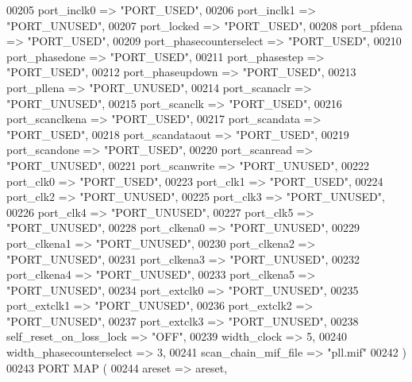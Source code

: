 \begin{DoxyCode}
{00205         port\_inclk0 => \textcolor{keyword}{"PORT\_USED"},
00206         port\_inclk1 => \textcolor{keyword}{"PORT\_UNUSED"},
00207         port\_locked => \textcolor{keyword}{"PORT\_USED"},
00208         port\_pfdena => \textcolor{keyword}{"PORT\_USED"},
00209         port\_phasecounterselect => \textcolor{keyword}{"PORT\_USED"},
00210         port\_phasedone => \textcolor{keyword}{"PORT\_USED"},
00211         port\_phasestep => \textcolor{keyword}{"PORT\_USED"},
00212         port\_phaseupdown => \textcolor{keyword}{"PORT\_USED"},
00213         port\_pllena => \textcolor{keyword}{"PORT\_UNUSED"},
00214         port\_scanaclr => \textcolor{keyword}{"PORT\_UNUSED"},
00215         port\_scanclk => \textcolor{keyword}{"PORT\_USED"},
00216         port\_scanclkena => \textcolor{keyword}{"PORT\_USED"},
00217         port\_scandata => \textcolor{keyword}{"PORT\_USED"},
00218         port\_scandataout => \textcolor{keyword}{"PORT\_USED"},
00219         port\_scandone => \textcolor{keyword}{"PORT\_USED"},
00220         port\_scanread => \textcolor{keyword}{"PORT\_UNUSED"},
00221         port\_scanwrite => \textcolor{keyword}{"PORT\_UNUSED"},
00222         port\_clk0 => \textcolor{keyword}{"PORT\_USED"},
00223         port\_clk1 => \textcolor{keyword}{"PORT\_USED"},
00224         port\_clk2 => \textcolor{keyword}{"PORT\_UNUSED"},
00225         port\_clk3 => \textcolor{keyword}{"PORT\_UNUSED"},
00226         port\_clk4 => \textcolor{keyword}{"PORT\_UNUSED"},
00227         port\_clk5 => \textcolor{keyword}{"PORT\_UNUSED"},
00228         port\_clkena0 => \textcolor{keyword}{"PORT\_UNUSED"},
00229         port\_clkena1 => \textcolor{keyword}{"PORT\_UNUSED"},
00230         port\_clkena2 => \textcolor{keyword}{"PORT\_UNUSED"},
00231         port\_clkena3 => \textcolor{keyword}{"PORT\_UNUSED"},
00232         port\_clkena4 => \textcolor{keyword}{"PORT\_UNUSED"},
00233         port\_clkena5 => \textcolor{keyword}{"PORT\_UNUSED"},
00234         port\_extclk0 => \textcolor{keyword}{"PORT\_UNUSED"},
00235         port\_extclk1 => \textcolor{keyword}{"PORT\_UNUSED"},
00236         port\_extclk2 => \textcolor{keyword}{"PORT\_UNUSED"},
00237         port\_extclk3 => \textcolor{keyword}{"PORT\_UNUSED"},
00238         self\_reset\_on\_loss\_lock => \textcolor{keyword}{"OFF"},
00239         width\_clock => \textcolor{vhdllogic}{5},
00240         width\_phasecounterselect => \textcolor{vhdllogic}{3},
00241         scan\_chain\_mif\_file => \textcolor{keyword}{"pll.mif"}
00242     \textcolor{vhdlchar}{)}
00243     \textcolor{keywordflow}{PORT} \textcolor{keywordflow}{MAP} (
00244         areset => areset,
}
\end{DoxyCode}
